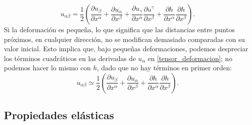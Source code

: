 \begin{equation}\label{tensor_deformacion}
u_{\alpha\beta}=\frac{1}{2}\left(
 \frac{\partial u_{\beta}}{\partial x^{\alpha}}+
 \frac{\partial u_{\alpha}}{\partial x^{\beta}}+
 \frac{\partial u_{\gamma}}{\partial x^{\alpha}}
\frac{\partial u^{\gamma}}{\partial x^{\beta}}+
\frac{\partial h}{\partial  x^{\alpha}}\frac{\partial h}{\partial x^{\beta}}\right).
\end{equation}
Si la deformación es pequeña, lo que significa que las distancias entre puntos
próximos, en cualquier dirección, no se modifican demasiado comparadas con 
su valor inicial. Esto implica que, bajo pequeñas deformaciones, podemos
despreciar los términos cuadráticos en las derivadas de $u_{\alpha}$ en
\eqref{tensor_deformacion}; no podemos hacer lo mismo con $h$, dado que no hay
términos en primer orden: 
 \begin{equation}\label{u_aprox}
 u_{\alpha\beta}\simeq\frac{1}{2}\left(
  \frac{\partial u_{\beta}}{\partial x^{\alpha}}+
  \frac{\partial u_{\alpha}}{\partial x^{\beta}}+
 \frac{\partial h}{\partial  x^{\alpha}}\frac{\partial h}{\partial x^{\beta}}\right).
\end{equation}

\subsection{Propiedades elásticas}

